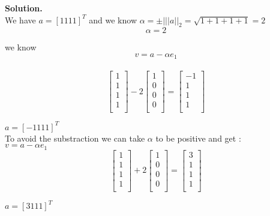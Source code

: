 \documentclass[12pt, oneside]{article}   	%
\begin{document}
\begin{enumerate}
	\textbf{Solution.}\\ 
	
	We have $a=[1 1 1 1]^T$ and we know $\alpha= \pm |||a||_2= \sqrt{1+1+1+1}=2$\\
	$$ \alpha=2$$
	
	we know  $$v=a- \alpha e_1$$\\
	$$\left [\begin{array}{c} 1\\1\\1\\1\\
	\end{array}\right]-2\left [\begin{array}{c} 1\\0\\0\\0\\
	\end{array}\right]=\left [\begin{array}{c} -1\\1\\1\\1\\
	\end{array}\right]$$
	
	 $a=[-1 1 1 1]^T$\\
	 
	 To avoid the substraction we can take $\alpha$ to be positive and get :\\
	 $v=a- \alpha e_1$\\
	 $$\left [\begin{array}{c} 1\\1\\1\\1\\
	 \end{array}\right]+2\left [\begin{array}{c} 1\\0\\0\\0\\
	 \end{array}\right]=\left [\begin{array}{c} 3\\1\\1\\1\\
	 \end{array}\right]$$
	 
	 $a=[3 1 1 1]^T$\\
	



\end{enumerate}
\end{document}
